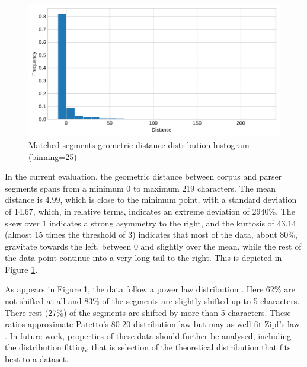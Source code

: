     \begin{figure}[!ht]
    \centering
    \includegraphics[width=.85\textwidth]{evaluation-results/figures/distance-distribution-histogram-Geometric-25.pdf}
    \caption{Matched segments geometric distance distribution histogram (binning=25)}
    \label{fig:distance-distribution-histogram-Geometric-25}
    \end{figure}

    In the current evaluation, the geometric distance between corpus and parser segments spans from a minimum 0 to maximum 219 characters. The mean distance is 4.99, which is close to the minimum point, with a standard deviation of 14.67, which, in relative terms, indicates an extreme deviation of 2940\%. The skew over 1 indicates a strong asymmetry to the right, and the kurtosis of 43.14 (almost 15 times the threshold of 3) indicates that most of the data, about 80\%, gravitate towards the left, between 0 and slightly over the mean, while the rest of the data point continue into a very long tail to the right. This is depicted in Figure \ref{fig:distance-distribution-histogram-Geometric-25}. 
    
    As appears in Figure \ref{fig:distance-distribution-histogram-Geometric-25}, the data follow a power law distribution \citep{newman2005power}. Here 62\% are not shifted at all and 83\% of the segments are slightly shifted up to 5 characters. There rest (27\%) of the segments are shifted by more than 5 characters. These ratios approximate Patetto's 80-20 distribution law but may as well fit Zipf's law \citep{newman2005power}. In future work, properties of these data should further be analysed, including the distribution fitting, that is selection of the theoretical distribution that fits best to a dataset.
    
